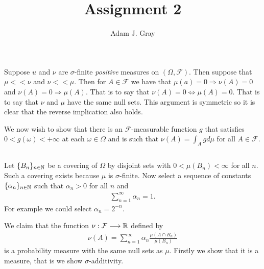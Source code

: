 \documentclass{unswmaths}
\begin{document}
\author{Adam J. Gray}
\title{Assignment 2}
\subject{Measure Theory}

\newcommand{\llra}{\Leftrightarrow}

\unswtitle

\section{}
\section{}
\subsection{}
Suppose $ u $ and $ \nu $ are $\sigma$-finite \emph{positive} measures on $ (\Omega, \mathcal{F}) $. Then suppose that $ \mu << \nu $ and $ \nu << \mu $.
Then for $ A \in \mathcal{F} $ we have that $ \mu(a) = 0 \Rightarrow \nu(A) = 0 $ and $ \nu(A) = 0 \Rightarrow \mu(A) $. That is to say that $ \nu(A) =0 \Leftrightarrow \mu(A) = 0 $. That is to say that $ \nu $ and $ \mu $ have the same null sets. This argument is symmetric so it is clear that the reverse implication also holds.

We now wish to show that there is an $ \mathcal{F}$-measurable function $ g $ that satisfies $ 0 < g(\omega) < +\infty $ at each $ \omega \in \Omega $ and is such that $ \nu(A) = \int_Agd\mu $ for all $ A \in \mathcal{F} $.

\subsection{}
Let $ \{ B_n \}_{n \in \mathbb{N}} $ be a covering of $ \Omega $ by disjoint sets with $ 0 < \mu(B_n) < \infty $ for all $ n $. Such a covering exists because $ \mu $ is $\sigma$-finite. Now select a sequence of constants $ \{ \alpha_n \}_{n \in \mathbb{N}} $ such that $ \alpha_n > 0 $ for all $ n $ and 
\begin{align}
	\sum_{n=1}^\infty \alpha_n = 1.
\end{align}
For example we could select  $ \alpha_n = 2^{-n} $.

We claim that the function $ \nu : \mathcal{F} \longrightarrow \mathbb{R} $ defined by
\begin{align}
	\nu(A) = \sum_{n=1}^\infty \alpha_n \frac{\mu(A \cap B_n)}{\mu(B_n)}
\end{align}
is a probability measure with the same null sets as $ \mu $.
Firstly we show that it is a measure, that is we show $\sigma$-additivity.
\end{document}
